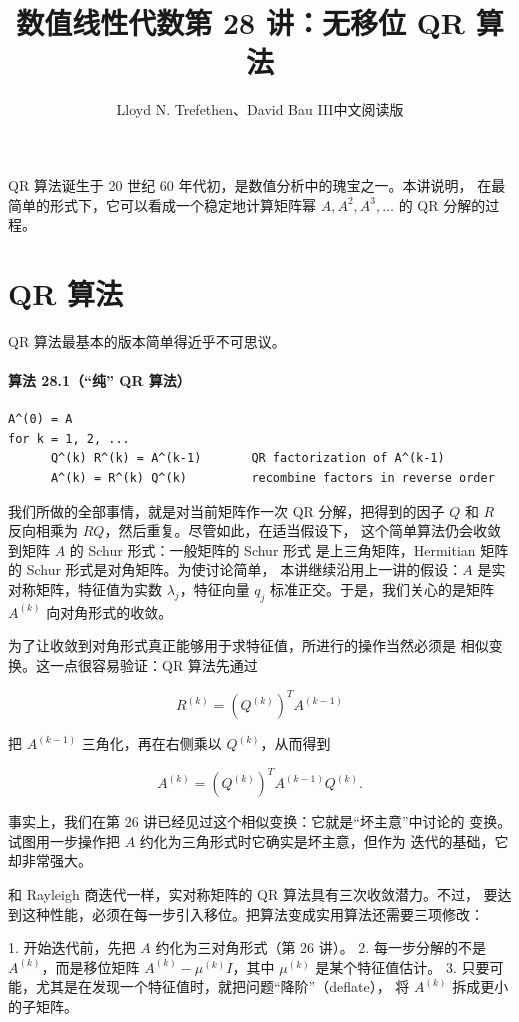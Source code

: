 \documentclass[UTF8,fontset=none,12pt]{ctexart}
\title{数值线性代数\quad 第 28 讲：无移位 QR 算法}
\author{Lloyd N. Trefethen、David Bau III\quad 中文阅读版}
\date{}
\begin{document}
\maketitle
\pagestyle{plain}

QR 算法诞生于 20 世纪 60 年代初，是数值分析中的瑰宝之一。本讲说明，
在最简单的形式下，它可以看成一个稳定地计算矩阵幂
$A,A^2,A^3,\ldots$ 的 QR 分解的过程。

\section*{QR 算法}

QR 算法最基本的版本简单得近乎不可思议。

\paragraph{算法 28.1（“纯” QR 算法）}
\begin{verbatim}
A^(0) = A
for k = 1, 2, ...
      Q^(k) R^(k) = A^(k-1)       QR factorization of A^(k-1)
      A^(k) = R^(k) Q^(k)         recombine factors in reverse order
\end{verbatim}

我们所做的全部事情，就是对当前矩阵作一次 QR 分解，把得到的因子
$Q$ 和 $R$ 反向相乘为 $RQ$，然后重复。尽管如此，在适当假设下，
这个简单算法仍会收敛到矩阵 $A$ 的 Schur 形式：一般矩阵的 Schur 形式
是上三角矩阵，Hermitian 矩阵的 Schur 形式是对角矩阵。为使讨论简单，
本讲继续沿用上一讲的假设：$A$ 是实对称矩阵，特征值为实数
$\lambda_j$，特征向量 $q_j$ 标准正交。于是，我们关心的是矩阵
$A^{(k)}$ 向对角形式的收敛。

为了让收敛到对角形式真正能够用于求特征值，所进行的操作当然必须是
相似变换。这一点很容易验证：QR 算法先通过

$$
R^{(k)}=(Q^{(k)})^TA^{(k-1)}
$$

把 $A^{(k-1)}$ 三角化，再在右侧乘以 $Q^{(k)}$，从而得到

$$
A^{(k)}=(Q^{(k)})^TA^{(k-1)}Q^{(k)}.
$$

事实上，我们在第 26 讲已经见过这个相似变换：它就是“坏主意”中讨论的
变换。试图用一步操作把 $A$ 约化为三角形式时它确实是坏主意，但作为
迭代的基础，它却非常强大。

和 Rayleigh 商迭代一样，实对称矩阵的 QR 算法具有三次收敛潜力。不过，
要达到这种性能，必须在每一步引入移位。把算法变成实用算法还需要三项修改：

1. 开始迭代前，先把 $A$ 约化为三对角形式（第 26 讲）。
2. 每一步分解的不是 $A^{(k)}$，而是移位矩阵
   $A^{(k)}-\mu^{(k)}I$，其中 $\mu^{(k)}$ 是某个特征值估计。
3. 只要可能，尤其是在发现一个特征值时，就把问题“降阶”（deflate），
     将 $A^{(k)}$ 拆成更小的子矩阵。
\end{document}
